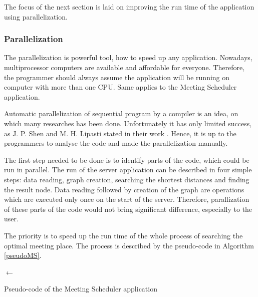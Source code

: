 \documentclass[thesis=M,english]{FITthesis}[2012/10/20]
\begin{document}
The focus of the next section is laid on improving the run time of the application using parallelization.

\subsubsection{Parallelization}
\label{sec:real_parallelization}
The parallelization is powerful tool, how to speed up any application. Nowadays, multiprocessor computers are available and affordable for everyone. Therefore, the programmer should always assume the application will be running on computer with more than one CPU. Same applies to the Meeting Scheduler application.

Automatic parallelization of sequential program by a compiler is an idea, on which many researches has been done. Unfortunately it has only limited success, as J. P. Shen and M. H. Lipasti stated in their work \cite{Shen04}. Hence, it is up to the programmers to analyse the code and made the parallelization manually.

The first step needed to be done is to identify parts of the code, which could be run in parallel. The run of the server application can be described in four simple steps: data reading, graph creation, searching the shortest distances and finding the result node. Data reading followed by creation of the graph are operations which are executed only once on the start of the server. Therefore, parallization of these parts of the code would not bring significant difference, especially to the user. 

The priority is to speed up the run time of the whole process of searching the optimal meeting place.
The process is described by the pseudo-code in Algorithm \ref{pseudoMS}.

\begin{algorithm}[H]

\BlankLine
\DA $\leftarrow$ \CreateDA{\G}\;

\Return{\RN}
\caption{Pseudo-code of the Meeting Scheduler application}
\label{pseudoMS}
\end{algorithm}
\end{document}

